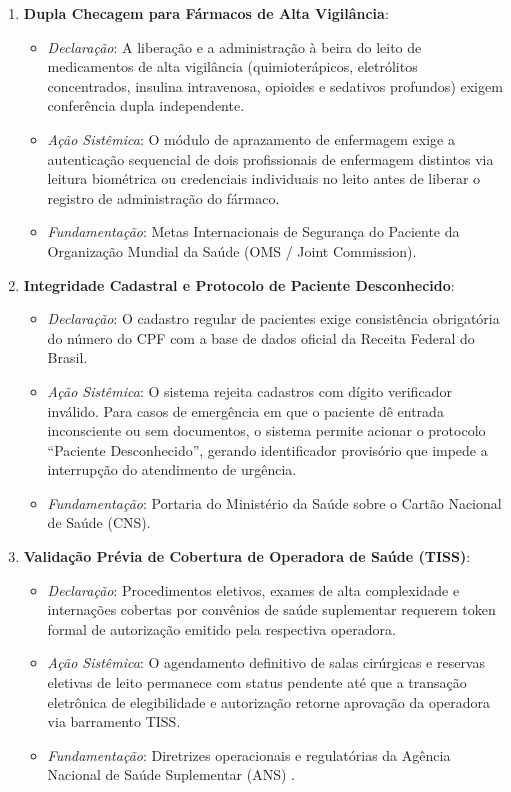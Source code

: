\begin{enumerate}[label=\textbf{RN-\arabic*:}, leftmargin=*]
    \item \textbf{Dupla Checagem para Fármacos de Alta Vigilância}:
    \begin{itemize}[noitemsep]
        \item \textit{Declaração}: A liberação e a administração à beira do leito de medicamentos de alta vigilância (quimioterápicos, eletrólitos concentrados, insulina intravenosa, opioides e sedativos profundos) exigem conferência dupla independente.
        \item \textit{Ação Sistêmica}: O módulo de aprazamento de enfermagem exige a autenticação sequencial de dois profissionais de enfermagem distintos via leitura biométrica ou credenciais individuais no leito antes de liberar o registro de administração do fármaco.
        \item \textit{Fundamentação}: Metas Internacionais de Segurança do Paciente da Organização Mundial da Saúde (OMS / Joint Commission).
    \end{itemize}

    \item \textbf{Integridade Cadastral e Protocolo de Paciente Desconhecido}:
    \begin{itemize}[noitemsep]
        \item \textit{Declaração}: O cadastro regular de pacientes exige consistência obrigatória do número do CPF com a base de dados oficial da Receita Federal do Brasil.
        \item \textit{Ação Sistêmica}: O sistema rejeita cadastros com dígito verificador inválido. Para casos de emergência em que o paciente dê entrada inconsciente ou sem documentos, o sistema permite acionar o protocolo ``Paciente Desconhecido'', gerando identificador provisório que impede a interrupção do atendimento de urgência.
        \item \textit{Fundamentação}: Portaria do Ministério da Saúde sobre o Cartão Nacional de Saúde (CNS).
    \end{itemize}

    \item \textbf{Validação Prévia de Cobertura de Operadora de Saúde (TISS)}:
    \begin{itemize}[noitemsep]
        \item \textit{Declaração}: Procedimentos eletivos, exames de alta complexidade e internações cobertas por convênios de saúde suplementar requerem token formal de autorização emitido pela respectiva operadora.
        \item \textit{Ação Sistêmica}: O agendamento definitivo de salas cirúrgicas e reservas eletivas de leito permanece com status pendente até que a transação eletrônica de elegibilidade e autorização retorne aprovação da operadora via barramento TISS.
        \item \textit{Fundamentação}: Diretrizes operacionais e regulatórias da Agência Nacional de Saúde Suplementar (ANS) \cite{ans_tiss:2023}.
    \end{itemize}


\end{enumerate}
